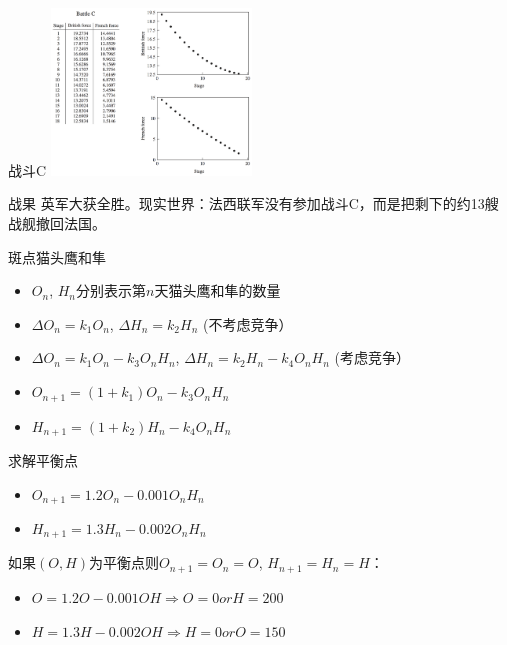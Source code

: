 \documentclass[
  ignorenonframetext,
]{ctexbeamer}
\providecommand{\tightlist}{%
  \setlength{\itemsep}{0pt}\setlength{\parskip}{0pt}}\usepackage{longtable,booktabs,array}
\begin{document}
\begin{frame}{战斗C}
\label{ux6218ux6597c}
\includegraphics[width=0.4\textwidth,height=\textheight]{fight-C.png}
\end{frame}

\begin{frame}{战果}
\label{ux6218ux679c}
英军大获全胜。现实世界：法西联军没有参加战斗C，而是把剩下的约13艘战舰撤回法国。
\end{frame}

\begin{frame}{斑点猫头鹰和隼}
\label{ux6591ux70b9ux732bux5934ux9e70ux548cux96bc}
\begin{itemize}
\tightlist
\item
  \(O_n\), \(H_n\)分别表示第\(n\)天猫头鹰和隼的数量
\item
  \(\Delta O_n=k_1O_n\), \(\Delta H_n=k_2H_n\) (不考虑竞争）
\item
  \(\Delta O_n=k_1O_n - k_3O_nH_n\), \(\Delta H_n=k_2H_n-k_4O_nH_n\)
  (考虑竞争）
\item
  \(O_{n+1}=(1+k_1)O_n - k_3O_nH_n\)
\item
  \(H_{n+1}=(1+k_2)H_n-k_4O_nH_n\)
\end{itemize}
\end{frame}

\begin{frame}{求解平衡点}
\label{ux6c42ux89e3ux5e73ux8861ux70b9}
\begin{itemize}
\tightlist
\item
  \(O_{n+1}=1.2O_n - 0.001O_nH_n\)
\item
  \(H_{n+1}=1.3H_n - 0.002O_nH_n\)
\end{itemize}

如果\((O,H)\)为平衡点则\(O_{n+1}=O_n=O\), \(H_{n+1}=H_n=H\)：

\begin{itemize}
\tightlist
\item
  \(O=1.2O - 0.001OH \Rightarrow O = 0 or H = 200\)
\item
  \(H=1.3H - 0.002OH \Rightarrow H = 0 or O = 150\)
\end{itemize}
\end{frame}
\end{document}
